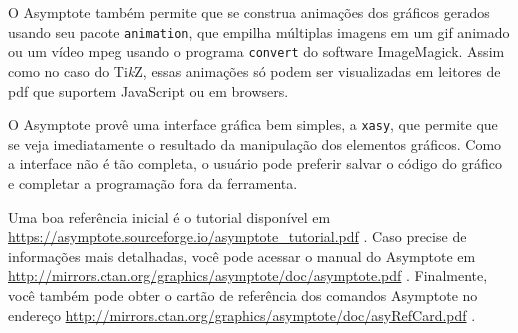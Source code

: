 O Asymptote também permite que se construa animações dos gráficos gerados usando seu pacote \texttt{animation}, que empilha múltiplas imagens em um \gls{gif} animado ou um vídeo \gls{mpeg} usando o programa \texttt{convert} do software ImageMagick. Assim como no caso do Ti\textit{k}Z, essas animações só podem ser visualizadas em leitores de \gls{pdf} que suportem JavaScript ou em browsers.

O Asymptote provê uma interface gráfica bem simples, a \texttt{xasy}, que permite que se veja imediatamente o resultado da manipulação dos elementos gráficos. Como a interface não é tão completa, o usuário pode preferir salvar o código do gráfico e completar a programação fora da ferramenta.

Uma boa referência inicial é o tutorial disponível em \url{https://asymptote.sourceforge.io/asymptote_tutorial.pdf} \parencite{asymptotetut}. Caso precise de informações mais detalhadas, você pode acessar o manual do Asymptote em \url{http://mirrors.ctan.org/graphics/asymptote/doc/asymptote.pdf} \parencite{asymptote}. Finalmente, você também pode obter o cartão de referência dos comandos Asymptote no endereço \url{http://mirrors.ctan.org/graphics/asymptote/doc/asyRefCard.pdf} \parencite{asymptoterefcard}. 



